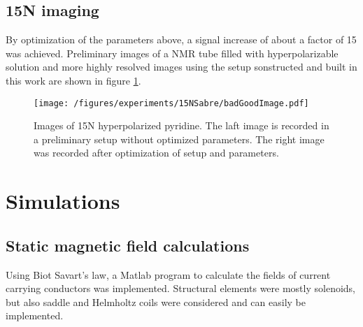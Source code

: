         \subsection{15N imaging}
        By optimization of the parameters above, a signal increase of about a factor of 15 was achieved. Preliminary images of a NMR tube filled with hyperpolarizable solution and more highly resolved images using the setup sonstructed and built in this work are shown in figure \ref{fig:results:15Nimage}.
        \begin{figure}
            \texttt{[image: /figures/experiments/15NSabre/badGoodImage.pdf]}
            \caption[15N image]{Images of 15N hyperpolarized pyridine. The laft image is recorded in a preliminary setup without optimized parameters. The right image was recorded after optimization of setup and parameters.}
            \label{fig:results:15Nimage}

        \end{figure}
\section{Simulations}
        \label{sec:results:sim}
        \subsection{Static magnetic field calculations}
        \label{sec:results:sim:B0}
            Using Biot Savart's law, a Matlab program to calculate the fields of current carrying conductors was implemented. Structural elements were mostly solenoids, but also saddle and Helmholtz coils were considered and can easily be implemented.
